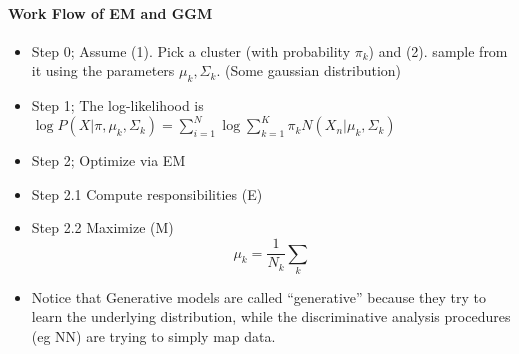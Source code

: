 \documentclass[10pt]{article}
\begin{document}
\paragraph{Work Flow of EM and GGM}
\begin{itemize}
    \item Step 0; Assume (1). Pick a cluster (with probability $\pi_k$) and (2). sample  from it using the parameters $\mu_k, \Sigma_k$. (Some gaussian distribution)
    \item Step 1; The log-likelihood is $\log P(X | \pi, \mu_k, \Sigma_k) = \sum_{i=1}^N \log \sum_{k=1}^K \pi_k N(X_n| \mu_k, \Sigma_k)$
    \item Step 2; Optimize via EM
    \item Step 2.1 Compute responsibilities (E)
    \item Step 2.2 Maximize (M)
    \begin{equation*}
        \mu_k = \frac{1}{N_k}\sum_k
    \end{equation*}
    \LARGE
    \item Notice that Generative models are called ``generative'' because they try to learn the underlying distribution, while the discriminative analysis procedures (eg NN) are trying to simply map data. 
\end{itemize}
\end{document}
